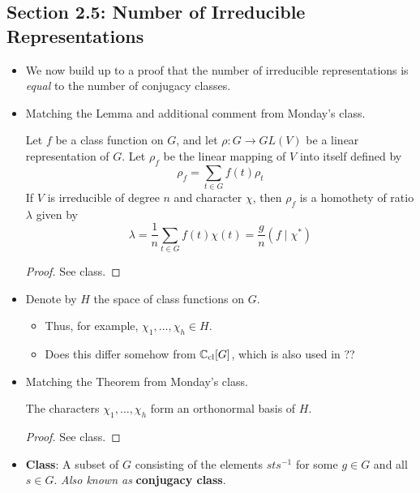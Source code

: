 \documentclass[../notes.tex]{subfiles}
\begin{document}
\subsection*{Section 2.5: Number of Irreducible Representations}
\begin{itemize}
    \item {}We now build up to a proof that the number of irreducible representations is \emph{equal} to the number of conjugacy classes.
    \item Matching the Lemma and additional comment from Monday's class.
    \setcounter{proposition}{5}
    \begin{proposition}
        Let $f$ be a class function on $G$, and let $\rho:G\to GL(V)$ be a linear representation of $G$. Let $\rho_f$ be the linear mapping of $V$ into itself defined by
        \begin{equation*}
            \rho_f = \sum_{t\in G}f(t)\rho_t
        \end{equation*}
        If $V$ is irreducible of degree $n$ and character $\chi$, then $\rho_f$ is a homothety of ratio $\lambda$ given by
        \begin{equation*}
            \lambda = \frac{1}{n}\sum_{t\in G}f(t)\chi(t)
            = \frac{g}{n}(f\mid\chi^*)
        \end{equation*}
        \begin{proof}
            See class.
        \end{proof}
    \end{proposition}
    \item Denote by $H$ the space of class functions on $G$.
    \begin{itemize}
        \item Thus, for example, $\chi_1,\dots,\chi_h\in H$.
        \item Does this differ somehow from $\mathbb{C}_\text{cl}[G]$, which is also used in \textcite{bib:Serre}??
    \end{itemize}
    \item Matching the Theorem from Monday's class.
    \setcounter{theorem}{5}
    \begin{theorem}
        The characters $\chi_1,\dots,\chi_h$ form an orthonormal basis of $H$.
        \begin{proof}
            See class.
        \end{proof}
    \end{theorem}
    \item \textbf{Class}: A subset of $G$ consisting of the elements $sts^{-1}$ for some $g\in G$ and all $s\in G$. \emph{Also known as} \textbf{conjugacy class}.

\end{itemize}
\end{document}
